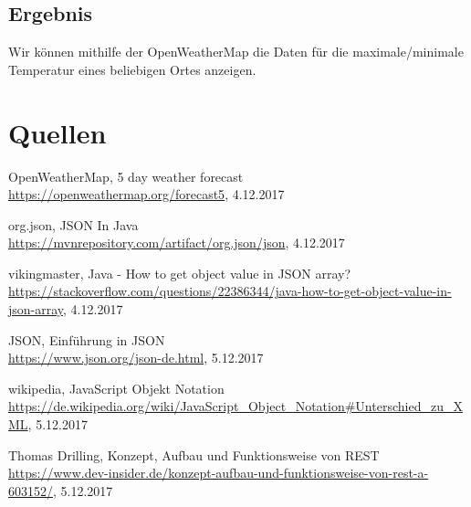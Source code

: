 \subsection{Ergebnis}

Wir können mithilfe der OpenWeatherMap die Daten für die maximale/minimale Temperatur eines beliebigen Ortes anzeigen.

\section{Quellen}
\begin{thebibliography}{999}
 OpenWeatherMap, 5 day weather forecast \\ \url{https://openweathermap.org/forecast5}, 4.12.2017

 org.json, JSON In Java \\ \url{https://mvnrepository.com/artifact/org.json/json}, 4.12.2017

 vikingmaster, Java - How to get object value in JSON array? \\ \url{https://stackoverflow.com/questions/22386344/java-how-to-get-object-value-in-json-array}, 4.12.2017
\end{thebibliography}

 JSON, Einführung in JSON \\
\url{https://www.json.org/json-de.html}, 5.12.2017

 wikipedia, JavaScript Objekt Notation \\
\url{https://de.wikipedia.org/wiki/JavaScript_Object_Notation#Unterschied_zu_XML}, 5.12.2017

 Thomas Drilling, Konzept, Aufbau und Funktionsweise von REST \\
\url{https://www.dev-insider.de/konzept-aufbau-und-funktionsweise-von-rest-a-603152/}, 5.12.2017






